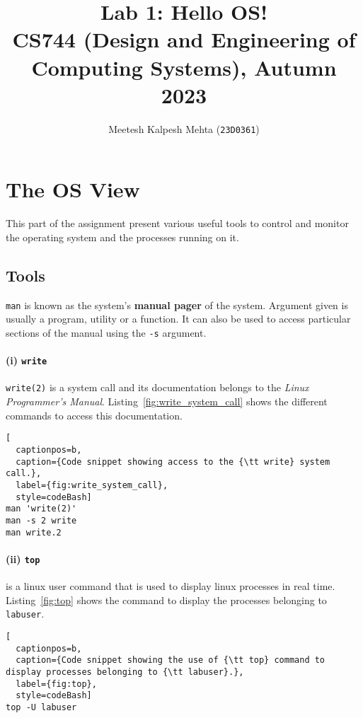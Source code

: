 \documentclass[final,5p,times,authoryear]{elsarticle}
\begin{document}
\begin{frontmatter}
    
\title{
  Lab 1: Hello OS! \\
  \small CS744 (Design and Engineering of Computing Systems), 
  Autumn 2023
  }

\author{Meetesh Kalpesh Mehta ({\tt23D0361})}
\address{Indian Institute of Bombay, India}

\end{frontmatter}

\section{The OS View}

This part of the assignment present various useful tools to control and monitor the operating system and the processes running on it. 

\subsection{Tools}
\noindent
{\tt man} is known as the system's {\bf manual pager} of the system. 
Argument given is usually a program, utility or a function.
It can also be used to access particular sections of the manual using the {\tt -s} argument.


% 
% 
\paragraph{(i) {\tt write}}
\noindent
{\tt write(2)} is a system call and its documentation belongs to the {\it Linux Programmer's Manual}. Listing~\ref{fig:write_system_call} shows the different commands to access this documentation.
\begin{lstlisting}[
  captionpos=b, 
  caption={Code snippet showing access to the {\tt write} system call.},
  label={fig:write_system_call},
  style=codeBash]
man 'write(2)'
man -s 2 write
man write.2
\end{lstlisting}

% 
% 
\paragraph{(ii) {\tt top}}is a linux  user command that is used to display linux processes in real time. Listing~\ref{fig:top} shows the command to display the processes belonging to {\tt labuser}.
\begin{lstlisting}[
  captionpos=b, 
  caption={Code snippet showing the use of {\tt top} command to display processes belonging to {\tt labuser}.},
  label={fig:top},
  style=codeBash]
top -U labuser
\end{lstlisting}
\end{document}
